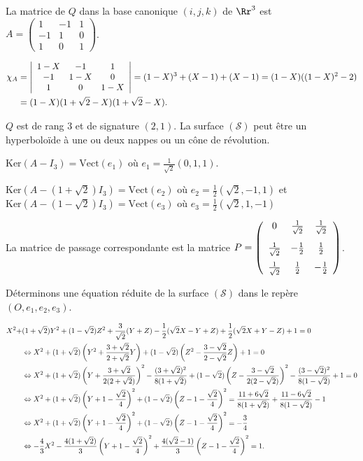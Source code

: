 {\begin{enumerate}
{La matrice de $Q$ dans la base canonique $(i,j,k)$ de $\Rr^3$ est $A=\left(
\begin{array}{ccc}
1&-1&1\\
-1&1&0\\
1&0&1
\end{array}
\right)$.

\begin{align*}\ensuremath
\chi_A&=\left|
\begin{array}{ccc}
1-X&-1&1\\
-1&1-X&0\\
1&0&1-X
\end{array}
\right|= (1-X)^3+(X-1)+(X-1) = (1-X)((1-X)^2 - 2)\\
 &= (1-X)(1+\sqrt{2}-X)(1+\sqrt{2}-X).
\end{align*}

$Q$ est de rang $3$ et de signature $(2,1)$. La surface $(\mathcal{S})$ peut être un hyperboloïde à une ou deux nappes ou un cône de révolution.

$\text{Ker}(A-I_3) =\text{Vect}(e_1)$ où $e_1=\frac{1}{\sqrt{2}}(0,1,1)$.
  

$\text{Ker}(A-(1+\sqrt{2})I_3)=\text{Vect}(e_2)$ où $e_2=\frac{1}{2}(\sqrt{2},-1,1)$ et  $\text{Ker}(A-(1-\sqrt{2})I_3)=\text{Vect}(e_3)$ où $e_3=\frac{1}{2}(\sqrt{2},1,-1)$

 
La matrice de passage correspondante est la matrice $P=\left(
\begin{array}{ccc}
0&\frac{1}{\sqrt{2}}&\frac{1}{\sqrt{2}}\\
\rule[-4mm]{0mm}{10mm}\frac{1}{\sqrt{2}}&-\frac{1}{2}&\frac{1}{2}\\
\frac{1}{\sqrt{2}}&\frac{1}{2}&-\frac{1}{2}
\end{array}
\right)$.

Déterminons une équation réduite de la surface $(\mathcal{S})$ dans le repère $(O,e_1,e_2,e_3)$.

\begin{align*}\ensuremath
X^2+&(1+\sqrt{2})Y^2+(1-\sqrt{2})Z^2+\frac{3}{\sqrt{2}}(Y+Z)-\frac{1}{2}(\sqrt{2}X-Y+Z)+\frac{1}{2}(\sqrt{2}X+Y-Z)+1 = 0\\
 &\Leftrightarrow X^2+(1+\sqrt{2})\left(Y^2+\frac{3+\sqrt{2}}{2+\sqrt{2}}Y\right)+(1-\sqrt{2})\left(Z^2-\frac{3-\sqrt{2}}{2-\sqrt{2}}Z\right)+1 = 0\\
 &\Leftrightarrow X^2+(1+\sqrt{2})\left(Y+\frac{3+\sqrt{2}}{2(2+\sqrt{2})}\right)^2-\frac{(3+\sqrt{2})^2}{8(1+\sqrt{2})}+(1-\sqrt{2})\left(Z-\frac{3-\sqrt{2}}{2(2-\sqrt{2})}\right)^2-\frac{(3-\sqrt{2})^2}{8(1-\sqrt{2})}+1 = 0\\
 &\Leftrightarrow X^2+(1+\sqrt{2})\left(Y+1-\frac{\sqrt{2}}{4}\right)^2+(1-\sqrt{2})\left(Z-1-\frac{\sqrt{2}}{4}\right)^2 =\frac{11+6\sqrt{2}}{8(1+\sqrt{2})}+\frac{11-6\sqrt{2}}{8(1-\sqrt{2})}-1\\
 &\Leftrightarrow X^2+(1+\sqrt{2})\left(Y+1-\frac{\sqrt{2}}{4}\right)^2+(1-\sqrt{2})\left(Z-1-\frac{\sqrt{2}}{4}\right)^2 =-\frac{3}{4}\\
  &\Leftrightarrow-\frac{4}{3}X^2-\frac{4(1+\sqrt{2})}{3}\left(Y+1-\frac{\sqrt{2}}{4}\right)^2+\frac{4(\sqrt{2}-1)}{3}\left(Z-1-\frac{\sqrt{2}}{4}\right)^2 =1.
\end{align*}

}
\end{enumerate}}
